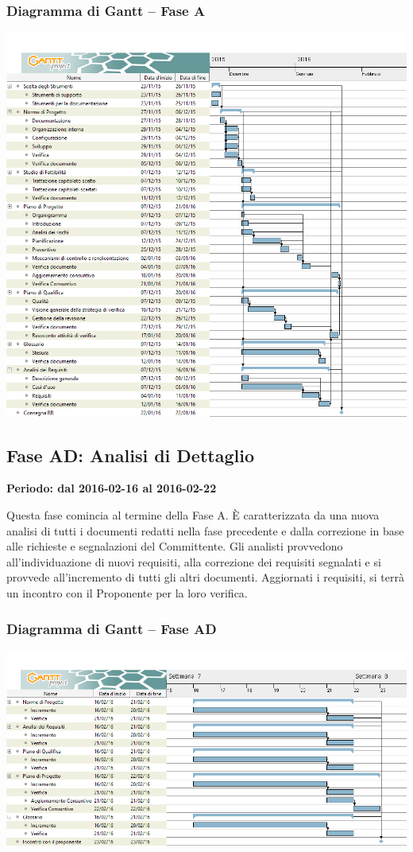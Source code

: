 \documentclass[../PianoProgetto.tex]{subfiles}
\begin{document}
\begin{enumerate}
		\subsubsection{Diagramma di Gantt – Fase A}
			\includegraphics[width=\textwidth]{gantt_png/1-analisi}
			
		
	\subsection{Fase AD: Analisi di Dettaglio}
		\textbf{Periodo: dal 2016-02-16 al 2016-02-22}

				Questa fase comincia al termine della Fase A. È caratterizzata da una nuova analisi di tutti i documenti redatti nella fase precedente e dalla correzione in base alle richieste e segnalazioni del Committente. Gli analisti provvedono all’individuazione di nuovi requisiti, alla correzione dei requisiti segnalati e si provvede all’incremento di tutti gli altri documenti.  Aggiornati i requisiti, si terrà un incontro con il Proponente per la loro verifica.
			
		\subsubsection{Diagramma di Gantt – Fase AD}
			\includegraphics[width=\textwidth]{gantt_png/2-analisi_di_dettaglio}


	\end{enumerate}
\end{document}
